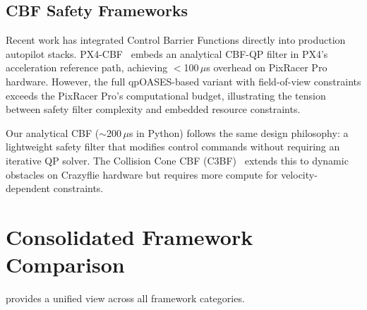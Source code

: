 
\subsection{CBF Safety Frameworks}

Recent work has integrated Control Barrier Functions directly into production autopilot stacks. PX4-CBF~\cite{px4cbf2024} embeds an analytical CBF-QP filter in PX4's acceleration reference path, achieving $<$100\,$\mu$s overhead on PixRacer Pro hardware. However, the full qpOASES-based variant with field-of-view constraints exceeds the PixRacer Pro's computational budget, illustrating the tension between safety filter complexity and embedded resource constraints.

Our analytical CBF ($\sim$200\,$\mu$s in Python) follows the same design philosophy: a lightweight safety filter that modifies control commands without requiring an iterative QP solver. The Collision Cone CBF (C3BF)~\cite{c3bf2024} extends this to dynamic obstacles on Crazyflie hardware but requires more compute for velocity-dependent constraints.

\section{Consolidated Framework Comparison}
\label{sec:consolidated}

 provides a unified view across all framework categories.


